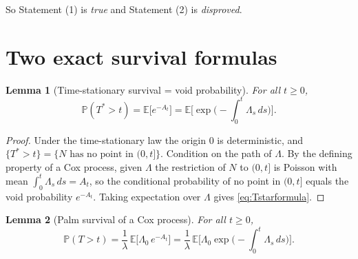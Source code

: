 \documentclass{amsart}
\theoremstyle{plain}
\newtheorem{lemma}{Lemma}
\theoremstyle{definition}
\newcommand{\E}{\mathbb{E}}
\newcommand{\Prob}{\mathbb{P}}
\newcommand{\Lam}{\Lambda}
\begin{document}
So Statement (1) is \emph{true} and Statement (2) is \emph{disproved}.

\section{Two exact survival formulas}

\begin{lemma}[Time-stationary survival = void probability]\label{lem:Tstar}
For all $t\ge0$,
\begin{equation}\label{eq:Tstarformula}
  \Prob(T^\ast>t)=\E\big[e^{-A_t}\big]
   =\E\!\Big[\exp\!\Big(-\int_0^t\Lam_s\,ds\Big)\Big].
\end{equation}
\end{lemma}

\begin{proof}
Under the time-stationary law the origin $0$ is deterministic, and
$\{T^\ast>t\}=\{N\text{ has no point in }(0,t]\}$. Condition on the path of $\Lam$.
By the defining property of a Cox process, given $\Lam$ the restriction of $N$ to
$(0,t]$ is Poisson with mean $\int_0^t\Lam_s\,ds=A_t$, so the conditional probability
of no point in $(0,t]$ equals the void probability $e^{-A_t}$. Taking expectation over
$\Lam$ gives \eqref{eq:Tstarformula}.
\end{proof}

\begin{lemma}[Palm survival of a Cox process]\label{lem:palm}
For all $t\ge0$,
\begin{equation}\label{eq:palm}
  \Prob(T>t)=\frac1\lambda\,\E\big[\Lam_0\,e^{-A_t}\big]
   =\frac1\lambda\,\E\!\Big[\Lam_0\exp\!\Big(-\int_0^t\Lam_s\,ds\Big)\Big].
\end{equation}
\end{lemma}
\end{document}
